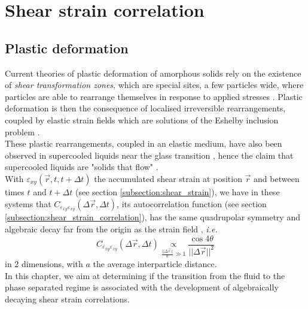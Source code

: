 \documentclass[class=report, float=false, crop=false]{standalone}
\begin{document}
\chapter{Shear strain correlation}
\label{chap:strain}

\section{Plastic deformation}
\label{section:plastic_deformation}

Current theories of plastic deformation of amorphous solids rely on the existence of \textit{shear transformation zones}, which are special sites, a few particles wide, where particles are able to rearrange themselves in response to applied stresses \cite{falk1998dynamics}. Plastic deformation is then the consequence of localised irreversible rearrangements, coupled by elastic strain fields \cite{nicolas2014spatiotemporal} which are solutions of the Eshelby inclusion problem \cite{eshelby1959elastic}.\\

These plastic rearrangements, coupled in an elastic medium, have also been observed in supercooled liquids near the glass transition \cite{chattoraj2013elastic, illing2016strain, hassani2018long}, hence the claim that supercooled liquids are "solids that flow" \cite{dyre2006colloquium}.\\

With $\varepsilon_{xy}(\vec{r}, t, t + \Delta t)$ the accumulated shear strain at position $\vec{r}$ and between times $t$ and $t + \Delta t$ (see section \ref{subsection:shear_strain}), we have in these systems that $C_{\varepsilon_{xy}\varepsilon_{xy}}(\Delta \vec{r}, \Delta t)$, its autocorrelation function (see section \ref{subsection:shear_strain_correlation}), has the same quadrupolar symmetry and algebraic decay far from the origin as the strain field \cite{illing2016strain, hassani2018long}, \textit{i.e.}
\begin{equation}
C_{\varepsilon_{xy}\varepsilon_{xy}}(\Delta \vec{r}, \Delta t) \underset{\frac{||\Delta \vec{r}||}{a} \gg 1}{\propto} \frac{\cos4\theta}{||\Delta \vec{r}||^2}
\label{css_eshelby}
\end{equation}
in 2 dimensions, with $a$ the average interparticle distance.\\

In this chapter, we aim at determining if the transition from the fluid to the phase separated regime is associated with the development of algebraically decaying shear strain correlations.
\end{document}
